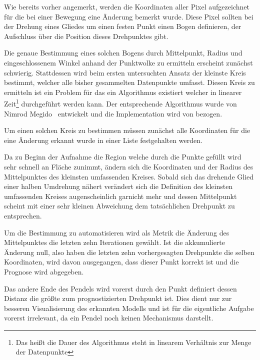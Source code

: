 Wie bereits vorher angemerkt, werden die Koordinaten aller Pixel aufgezeichnet für die bei einer Bewegung eine Änderung bemerkt wurde.
Diese Pixel sollten bei der Drehung eines Gliedes um einen festen Punkt einen Bogen definieren, der Aufschluss über die Position dieses Drehpunktes gibt.

Die genaue Bestimmung eines solchen Bogens durch Mittelpunkt, Radius und eingeschlossenem Winkel anhand der Punktwolke zu ermitteln erscheint zunächst schwierig.
Stattdessen wird beim ersten untersuchten Ansatz der kleinste Kreis bestimmt, welcher alle bisher gesammelten Datenpunkte umfasst.
Diesen Kreis zu ermitteln ist ein Problem für das ein Algorithmus existiert welcher in linearer Zeit\footnote{Das heißt die Dauer des Algorithmus steht in linearem Verhältnis zur Menge der Datenpunkte} durchgeführt werden kann.
Der entsprechende Algorithmus wurde von Nimrod Megido~\cite{Megiddo1983} entwickelt und die Implementation wird von  bezogen.


Um einen solchen Kreis zu bestimmen müssen zunächst alle Koordinaten für die eine Änderung erkannt wurde in einer Liste festgehalten werden.

Da zu Beginn der Aufnahme die Region welche durch die Punkte gefüllt wird sehr schnell an Fläche zunimmt, ändern sich die Koordinaten und der Radius des Mittelpunktes des kleinsten umfassenden Kreises.
Sobald sich das drehende Glied einer halben Umdrehung nähert verändert sich die Definition des kleinsten umfassenden Kreises augenscheinlich garnicht mehr und dessen Mittelpunkt scheint mit einer sehr kleinen Abweichung dem tatsächlichen Drehpunkt zu entsprechen.

Um die Bestimmung zu automatisieren wird als Metrik die Änderung des Mittelpunktes die letzten zehn Iterationen gewählt.
Ist die akkumulierte Änderung null, also haben die letzten zehn vorhergesagten Drehpunkte die selben Koordinaten, wird davon ausgegangen, dass dieser Punkt korrekt ist und die Prognose wird abgegeben.

Das andere Ende des Pendels wird vorerst durch den Punkt definiert dessen Distanz die größte zum prognostizierten Drehpunkt ist.
Dies dient nur zur besseren Visualisierung des erkannten Modells und ist für die eigentliche Aufgabe vorerst irrelevant, da ein Pendel noch keinen Mechanismus darstellt.

